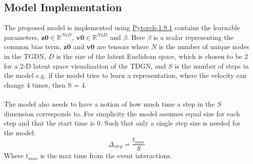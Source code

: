 \subsection{Model Implementation}
\label{sec:Method:ModelImplementation}
The proposed model is implemented using \hyperlink{https://pytorch.org/docs/1.9.1/}{Pytorch-1.9.1}\cite{PyTorchDocumentation} contains the learnable parameters, $\textbf{z0} \in \mathbb{R}^{N \text{x} D}$, $\textbf{v0} \in \mathbb{R}^{N \text{x} D}$ and $\beta$. Here $\beta$ is a scalar representing the common bias term, $\textbf{z0}$ and $\textbf{v0}$ are tensors where $N$ is the number of unique nodes in the TGDN, $D$ is the size of the latent Euclidean space, which is chosen to be 2 for a 2-D latent space visualization of the TDGN, and $S$ is the number of steps in the model e.g. if the model tries to learn a representation, where the velocity can change 4 times, then S = 4.
\\\\
The model also needs to have a notion of how much time a step in the $S$ dimension corresponds to. For simplicity the model assumes equal size for each step and that the start time is 0. Such that only a single step size is needed for the model:
\begin{equation}
    \Delta_{step} = \frac{t_{max}}{S}
\end{equation}
Where $t_{max}$ is the max time from the event interactions.


